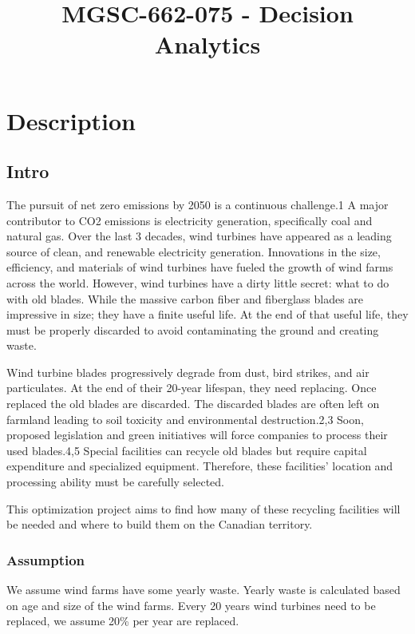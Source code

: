 \documentclass[11pt, oneside]{article}   	%
\title{MGSC-662-075 - Decision Analytics}
\author{}
\begin{document}
\maketitle


\section{Description}
\subsection{Intro}
The pursuit of net zero emissions by 2050 is a continuous challenge.1 A major contributor to CO2 emissions is electricity generation, specifically coal and natural gas. Over the last 3 decades, wind turbines have appeared as a leading source of clean, and renewable electricity generation. Innovations in the size, efficiency, and materials of wind turbines have fueled the growth of wind farms across the world. However, wind turbines have a dirty little secret: what to do with old blades. While the massive carbon fiber and fiberglass blades are impressive in size; they have a finite useful life. At the end of that useful life, they must be properly discarded to avoid contaminating the ground and creating waste. 

Wind turbine blades progressively degrade from dust, bird strikes, and air particulates. At the end of their 20-year lifespan, they need replacing. Once replaced the old blades are discarded. The discarded blades are often left on farmland leading to soil toxicity and environmental destruction.2,3 Soon, proposed legislation and green initiatives will force companies to process their used blades.4,5 Special facilities can recycle old blades but require capital expenditure and specialized equipment. Therefore, these facilities' location and processing ability must be carefully selected. 

This optimization project aims to find how many of these recycling facilities will be needed and where to build them on the Canadian territory.  

\subsubsection*{Assumption}
We assume wind farms have some yearly waste. Yearly waste is calculated based on age and size of the wind farms. Every 20 years wind turbines need to be replaced, we assume 20\% per year are replaced.  
\end{document}
